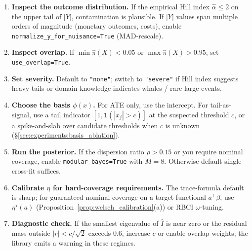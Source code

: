 \begin{enumerate}[1.,leftmargin=*,itemsep=2pt]
\item \textbf{Inspect the outcome distribution.} If the empirical
Hill index $\hat\alpha \le 2$ on the upper tail of $|Y|$, contamination
is plausible. If $|Y|$ values span multiple orders of magnitude
(monetary outcomes, costs), enable
\texttt{normalize\_y\_for\_nuisance=True} (MAD-rescale).
\item \textbf{Inspect overlap.} If $\min \hat\pi(X) < 0.05$ or
$\max \hat\pi(X) > 0.95$, set \texttt{use\_overlap=True}.
\item \textbf{Set severity.} Default to \texttt{"none"}; switch to
\texttt{"severe"} if Hill index suggests heavy tails or domain
knowledge indicates whales / rare large events.
\item \textbf{Choose the basis $\phi(x)$.} For ATE only, use the
intercept. For tail-as-signal, use a tail indicator
$[1, \mathbf{1}(|x_j|>c)]$ at the suspected threshold $c$, or a
spike-and-slab over candidate thresholds when $c$ is unknown
(\S\ref{sec:experiments:basis_ablation}).
\item \textbf{Run the posterior.} If the dispersion ratio
$\rho > 0.15$ or you require nominal coverage, enable
\texttt{modular\_bayes=True} with $M = 8$. Otherwise default
single-cross-fit suffices.
\item \textbf{Calibrate $\eta$ for hard-coverage requirements.} The
trace-formula default is sharp; for guaranteed nominal coverage on
a target functional $a^\top \beta$, use $\eta^\star(a)$
(Proposition~\ref{prop:welsch_calibration}(a)) or RBCI
$\omega$-tuning.
\item \textbf{Diagnostic check.} If the smallest eigenvalue of
$\widehat I$ is near zero or the residual mass outside $|r| <
c/\sqrt{2}$ exceeds $0.6$, increase $c$ or enable overlap weights;
the library emits a warning in these regimes.
\end{enumerate}

